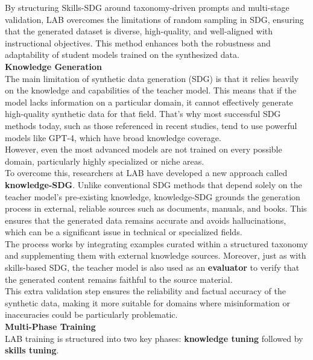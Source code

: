 \documentclass[12pt]{article}
\begin{document}
By structuring Skills-SDG around taxonomy-driven prompts and multi-stage validation, LAB overcomes the limitations of random sampling in SDG, ensuring that the generated dataset is diverse, high-quality, and well-aligned with instructional objectives. This method enhances both the robustness and adaptability of student models trained on the synthesized data.\vspace{14pt}\\
\textbf{Knowledge Generation}\\
The main limitation of synthetic data generation (SDG) is that it relies heavily on the knowledge and capabilities of the teacher model. This means that if the model lacks information on a particular domain, it cannot effectively generate high-quality synthetic data for that field. That’s why most successful SDG methods today, such as those referenced in recent studies, tend to use powerful models like GPT-4, which have broad knowledge coverage.\vspace{14pt}\\
However, even the most advanced models are not trained on every possible domain, particularly highly specialized or niche areas.\\
To overcome this, researchers at LAB have developed a new approach called \textbf{knowledge-SDG}. Unlike conventional SDG methods that depend solely on the teacher model’s pre-existing knowledge, knowledge-SDG grounds the generation process in external, reliable sources such as documents, manuals, and books. This ensures that the generated data remains accurate and avoids hallucinations, which can be a significant issue in technical or specialized fields.\vspace{14pt}\\
The process works by integrating examples curated within a structured taxonomy and supplementing them with external knowledge sources. Moreover, just as with skills-based SDG, the teacher model is also used as an \textbf{evaluator} to verify that the generated content remains faithful to the source material.\\
This extra validation step ensures the reliability and factual accuracy of the synthetic data, making it more suitable for domains where misinformation or inaccuracies could be particularly problematic.\vspace{14pt}\\
\textbf{Multi-Phase Training}\\
LAB training is structured into two key phases: \textbf{knowledge tuning} followed by \textbf{skills tuning}.\vspace{14pt}\\
\end{document}
